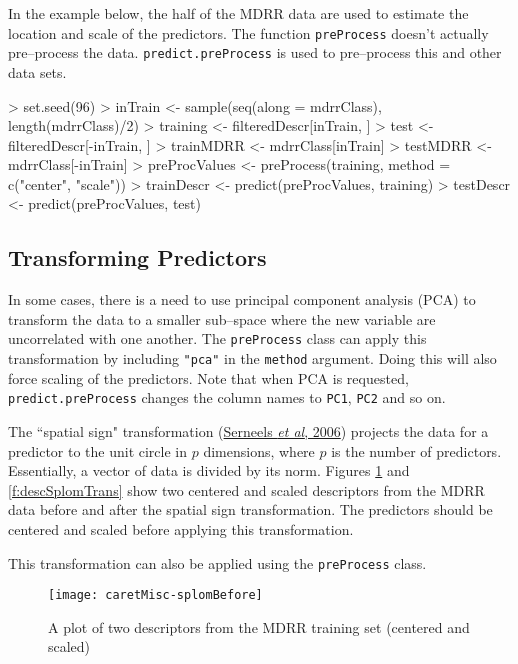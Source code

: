 \documentclass[12pt]{article}
\begin{document}
In the example below, the half of the MDRR data are used to estimate the location and scale of the predictors. The function \texttt{preProcess} doesn't actually pre--process the data. \texttt{predict.preProcess} is used to pre--process this and other data sets.
\begin{small}
\begin{Schunk}
\begin{Sinput}
> set.seed(96)
> inTrain <- sample(seq(along = mdrrClass), length(mdrrClass)/2)
> training <- filteredDescr[inTrain, ]
> test <- filteredDescr[-inTrain, ]
> trainMDRR <- mdrrClass[inTrain]
> testMDRR <- mdrrClass[-inTrain]
> preProcValues <- preProcess(training, method = c("center", "scale"))
> trainDescr <- predict(preProcValues, training)
> testDescr <- predict(preProcValues, test)
\end{Sinput}
\end{Schunk}
\end{small}

\subsection{Transforming Predictors}

In some cases, there is a need to use principal component analysis (PCA) to transform the data to a smaller sub--space where the new variable are uncorrelated with one another. The \texttt{preProcess} class can apply this transformation by including \texttt{"pca"} in the \texttt{method} argument. Doing this will also force scaling of the predictors. Note that when PCA is requested, \texttt{predict.preProcess} changes the column names to \texttt{PC1},  \texttt{PC2} and so on.

The ``spatial sign" transformation (\href{http://pubs.acs.org/cgi-bin/abstract.cgi/jcisd8/2006/46/i03/abs/ci050498u.html}{Serneels {\it et al}, 2006}) projects the data for a predictor to the unit circle in $p$ dimensions, where $p$ is the number of predictors. Essentially, a vector of data is divided by its norm. Figures \ref{f:descSplom} and \ref{f:descSplomTrans} show two centered and scaled descriptors from the MDRR data before and after the spatial sign transformation. The predictors should be centered and scaled before applying this transformation.

This transformation can also be applied using the \texttt{preProcess} class.

\begin{figure}[p]
   \begin{center}		
\texttt{[image: caretMisc-splomBefore]}
      \caption{A plot of two descriptors from the MDRR training set (centered and scaled)}
      \label{f:descSplom}         
   \end{center}
\end{figure}
\end{document}
